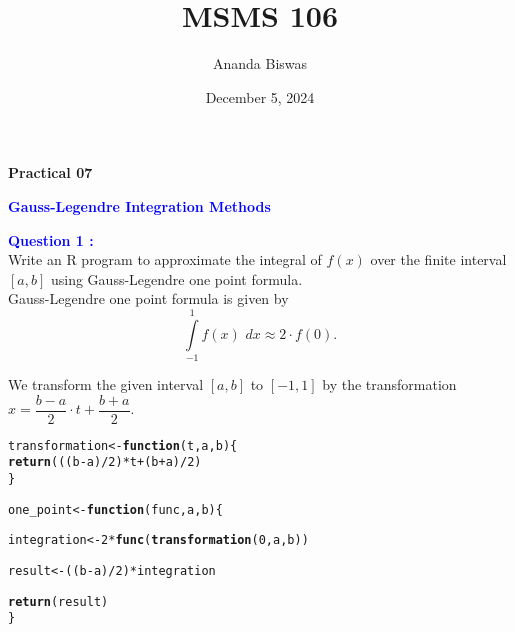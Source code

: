 \documentclass[11pt, a4paper]{article}\usepackage[]{graphicx}\usepackage[]{xcolor}
\title{MSMS 106}
\author{Ananda Biswas}
\date{December 5, 2024}
\makeatletter
\newcommand{\hlnum}[1]{\textcolor[rgb]{0.686,0.059,0.569}{#1}}%
\newcommand{\hlopt}[1]{\textcolor[rgb]{0,0,0}{#1}}%
\newcommand{\hldef}[1]{\textcolor[rgb]{0.345,0.345,0.345}{#1}}%
\newcommand{\hlkwa}[1]{\textcolor[rgb]{0.161,0.373,0.58}{\textbf{#1}}}%
\newcommand{\hlkwb}[1]{\textcolor[rgb]{0.69,0.353,0.396}{#1}}%
\newcommand{\hlkwc}[1]{\textcolor[rgb]{0.333,0.667,0.333}{#1}}%
\newcommand{\hlkwd}[1]{\textcolor[rgb]{0.737,0.353,0.396}{\textbf{#1}}}%
\newenvironment{kframe}{%
 \def\at@end@of@kframe{}%
 \ifinner\ifhmode%
  \def\at@end@of@kframe{\end{minipage}}%
  \begin{minipage}{\columnwidth}%
 \fi\fi%
 \def\FrameCommand##1{\hskip\@totalleftmargin \hskip-\fboxsep
 \colorbox{shadecolor}{##1}\hskip-\fboxsep
     \hskip-\linewidth \hskip-\@totalleftmargin \hskip\columnwidth}%
 \MakeFramed {\advance\hsize-\width
   \@totalleftmargin\z@ \linewidth\hsize
   \@setminipage}}%
 {\par\unskip\endMakeFramed%
 \at@end@of@kframe}
\newenvironment{knitrout}{}{} %
\makeatother
\begin{document}
\maketitle

\begin{center}
\textbf{Practical 07}
\end{center}

 \hspace{0.2cm} \textcolor{blue}{\textbf{Gauss-Legendre Integration Methods}}

\vspace{0.5cm}

\smallpencil \hspace{0.2cm} \textcolor{blue}{\textbf{Question 1 : }} \\

\hspace{1cm} Write an R program to approximate the integral of $f(x)$ over the finite interval $[a, b]$ using Gauss-Legendre one point formula. \\

\faArrowAltCircleRight[regular] \hspace{0.2cm} Gauss-Legendre one point formula is given by $$\int \limits_{-1}^{1} f(x) \,\, dx \approx 2 \cdot f(0). $$

We transform the given interval $\left[ a, b \right]$ to $\left[ -1, 1 \right]$ by the transformation $x = \dfrac{b - a}{2} \cdot t + \dfrac{b + a}{2}$.

\begin{knitrout}
\color{fgcolor}\begin{kframe}
\begin{alltt}
\hldef{transformation} \hlkwb{<-} \hlkwa{function}\hldef{(}\hlkwc{t}\hldef{,} \hlkwc{a}\hldef{,} \hlkwc{b}\hldef{)\{}
  \hlkwd{return}\hldef{( ( (b} \hlopt{-} \hldef{a)} \hlopt{/} \hlnum{2} \hldef{)} \hlopt{*} \hldef{t} \hlopt{+} \hldef{(b} \hlopt{+} \hldef{a)} \hlopt{/} \hlnum{2}\hldef{)}
\hldef{\}}
\end{alltt}
\end{kframe}
\end{knitrout}


\begin{knitrout}
\color{fgcolor}\begin{kframe}
\begin{alltt}
\hldef{one_point} \hlkwb{<-} \hlkwa{function}\hldef{(}\hlkwc{func}\hldef{,} \hlkwc{a}\hldef{,} \hlkwc{b}\hldef{)\{}

  \hldef{integration} \hlkwb{<-} \hlnum{2} \hlopt{*} \hlkwd{func}\hldef{(}\hlkwd{transformation}\hldef{(}\hlnum{0}\hldef{, a, b))}

  \hldef{result} \hlkwb{<-} \hldef{( (b} \hlopt{-} \hldef{a)} \hlopt{/} \hlnum{2} \hldef{)} \hlopt{*} \hldef{integration}

  \hlkwd{return}\hldef{(result)}
\hldef{\}}
\end{alltt}
\end{kframe}
\end{knitrout}
\end{document}
